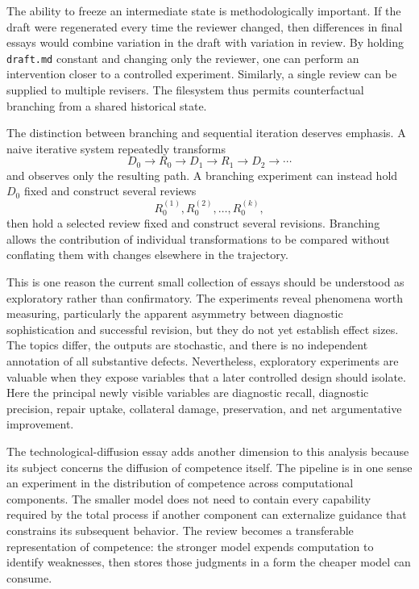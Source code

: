 \documentclass[11pt]{article}
\begin{document}
The ability to freeze an intermediate state is methodologically important. If the draft were regenerated every time the reviewer changed, then differences in final essays would combine variation in the draft with variation in review. By holding \texttt{draft.md} constant and changing only the reviewer, one can perform an intervention closer to a controlled experiment. Similarly, a single review can be supplied to multiple revisers. The filesystem thus permits counterfactual branching from a shared historical state.

The distinction between branching and sequential iteration deserves emphasis. A naive iterative system repeatedly transforms
\[
D_0\rightarrow R_0\rightarrow D_1\rightarrow R_1\rightarrow D_2\rightarrow\cdots
\]
and observes only the resulting path. A branching experiment can instead hold \(D_0\) fixed and construct several reviews
\[
R_0^{(1)},R_0^{(2)},\ldots,R_0^{(k)},
\]
then hold a selected review fixed and construct several revisions. Branching allows the contribution of individual transformations to be compared without conflating them with changes elsewhere in the trajectory.

This is one reason the current small collection of essays should be understood as exploratory rather than confirmatory. The experiments reveal phenomena worth measuring, particularly the apparent asymmetry between diagnostic sophistication and successful revision, but they do not yet establish effect sizes. The topics differ, the outputs are stochastic, and there is no independent annotation of all substantive defects. Nevertheless, exploratory experiments are valuable when they expose variables that a later controlled design should isolate. Here the principal newly visible variables are diagnostic recall, diagnostic precision, repair uptake, collateral damage, preservation, and net argumentative improvement.

The technological-diffusion essay adds another dimension to this analysis because its subject concerns the diffusion of competence itself. The pipeline is in one sense an experiment in the distribution of competence across computational components. The smaller model does not need to contain every capability required by the total process if another component can externalize guidance that constrains its subsequent behavior. The review becomes a transferable representation of competence: the stronger model expends computation to identify weaknesses, then stores those judgments in a form the cheaper model can consume.
\end{document}
